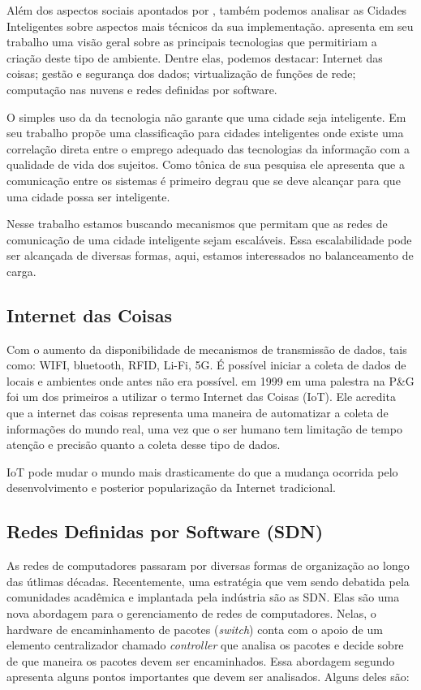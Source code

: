 \documentclass[12pt]{article}
\begin{document}
Além dos aspectos sociais apontados por \cite{Caragliu2011}, também podemos analisar as Cidades Inteligentes sobre aspectos mais técnicos da sua implementação. \cite{Gharaibeh2017} apresenta em seu trabalho uma visão geral sobre as principais tecnologias que permitiriam a criação deste tipo de ambiente. Dentre elas, podemos destacar: Internet das coisas; gestão e segurança dos dados; virtualização de funções de rede; computação nas nuvens e redes definidas por software. 

O simples uso da da tecnologia não garante que uma cidade seja inteligente. Em seu trabalho \cite{Anttiroiko2014} propõe uma classificação para cidades inteligentes onde existe uma correlação direta entre o emprego adequado das tecnologias da informação com a qualidade de vida dos sujeitos. Como tônica de sua pesquisa ele apresenta que a comunicação entre os sistemas é primeiro degrau que se deve alcançar para que uma cidade possa ser inteligente.

Nesse trabalho estamos buscando mecanismos que permitam que as redes de comunicação de uma cidade inteligente sejam escaláveis. Essa escalabilidade pode ser alcançada de diversas formas, aqui, estamos interessados no balanceamento de carga.

\subsection{Internet das Coisas}

Com o aumento da disponibilidade de mecanismos de transmissão de dados, tais como: WIFI, bluetooth, RFID, Li-Fi, 5G. É possível iniciar a coleta de dados de locais e ambientes onde antes não era possível. \cite{Ashton2009}  em 1999 em uma palestra na P&G foi um dos primeiros a utilizar o termo Internet das Coisas (IoT). Ele  acredita que a internet das coisas representa uma maneira de automatizar a coleta de informações do mundo real, uma vez que o ser humano tem limitação de tempo atenção e precisão quanto a coleta desse tipo de dados.

IoT pode mudar o mundo mais drasticamente do que a mudança ocorrida pelo desenvolvimento e posterior popularização da Internet tradicional.  


\subsection{Redes Definidas por Software (SDN)}

As redes de computadores passaram por diversas formas de organização ao longo das útlimas décadas. Recentemente, uma estratégia que vem sendo debatida pela comunidades acadêmica e implantada pela indústria são as SDN. Elas são uma nova abordagem para o gerenciamento de redes de computadores. Nelas, o hardware de encaminhamento de pacotes (\textit{switch}) conta com o apoio de um elemento centralizador chamado \textit{controller} que analisa os pacotes e decide sobre de que maneira os pacotes devem ser encaminhados. Essa abordagem segundo  \cite{Sezer_et_al_2013} apresenta alguns pontos importantes que devem ser analisados. Alguns deles são:
\end{document}
